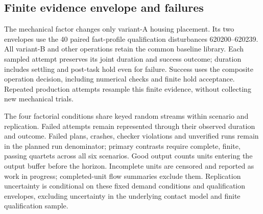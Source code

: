 \subsection{Finite evidence envelope and failures}
The mechanical factor changes only variant-A housing placement. Its two envelopes use the 40 paired fast-profile qualification disturbances 620200--620239. All variant-B and other operations retain the common baseline library. Each sampled attempt preserves its joint duration and success outcome; duration includes settling and post-task hold even for failure. Success uses the composite operation decision, including numerical checks and finite hold acceptance. Repeated production attempts resample this finite evidence, without collecting new mechanical trials.

The four factorial conditions share keyed random streams within scenario and replication. Failed attempts remain represented through their observed duration and outcome. Failed plans, crashes, checker violations and unverified runs remain in the planned run denominator; primary contrasts require complete, finite, passing quartets across all six scenarios. Good output counts units entering the output buffer before the horizon. Incomplete units are censored and reported as work in progress; completed-unit flow summaries exclude them. Replication uncertainty is conditional on these fixed demand conditions and qualification envelopes, excluding uncertainty in the underlying contact model and finite qualification sample.
